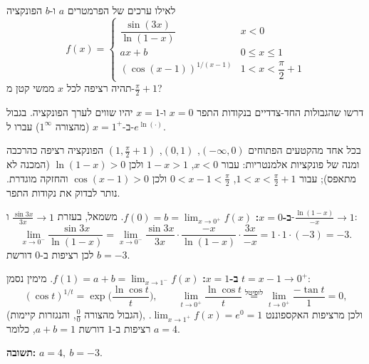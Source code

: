 
\begin{question}
לאילו ערכים של הפרמטרים $a$ ו-$b$ הפונקציה
\[ f(x)=\begin{cases} \dfrac{\sin(3x)}{\ln(1-x)} & x<0\\[2mm] ax+b & 0\le x\le1\\[2mm] (\cos(x-1))^{1/(x-1)} & 1<x<\dfrac{\pi}{2}+1\end{cases} \]
תהיה רציפה לכל $x$ ממשי קטן מ-$\frac{\pi}{2}+1$?
\end{question}

\begin{hint}
דרשו שהגבולות החד-צדדיים בנקודות התפר $x=0$ ו-$x=1$ יהיו שווים לערך הפונקציה. בגבול ב-$x=1^+$ (מהצורה $1^\infty$) עברו ל-$e^{\ln(\cdot)}$.
\end{hint}

\begin{solution}
בכל אחד מהקטעים הפתוחים $(-\infty,0)$, $(0,1)$, $(1,\frac\pi2+1)$ הפונקציה רציפה כהרכבה ומנה של פונקציות אלמנטריות: עבור $x<0$, $1-x>1$ ולכן $\ln(1-x)>0$ (המכנה לא מתאפס); עבור $1<x<\frac\pi2+1$, $0<x-1<\frac\pi2$ ולכן $\cos(x-1)>0$ והחזקה מוגדרת. נותר לבדוק את נקודות התפר.

\textbf{ב-$x=0$:} $f(0)=b=\lim_{x\to0^+}f(x)$. משמאל, בעזרת $\frac{\sin 3x}{3x}\to1$ ו-$\frac{\ln(1-x)}{-x}\to1$:
\[ \lim_{x\to0^-}\frac{\sin3x}{\ln(1-x)}=\lim_{x\to0^-}\frac{\sin3x}{3x}\cdot\frac{-x}{\ln(1-x)}\cdot\frac{3x}{-x}=1\cdot1\cdot(-3)=-3 . \]
לכן רציפות ב-$0$ דורשת $b=-3$.

\textbf{ב-$x=1$:} $f(1)=a+b=\lim_{x\to1^-}f(x)$. מימין נסמן $t=x-1\to0^+$:
\[ (\cos t)^{1/t}=\exp\Big(\frac{\ln\cos t}{t}\Big),\qquad \lim_{t\to0^+}\frac{\ln\cos t}{t}\overset{\text{לופיטל}}{=}\lim_{t\to0^+}\frac{-\tan t}{1}=0 , \]
(הגבול מהצורה $\frac00$, והנגזרות קיימות), ולכן מרציפות האקספוננט $\lim_{x\to1^+}f(x)=e^0=1$. רציפות ב-$1$ דורשת $a+b=1$, כלומר $a=4$.

\textbf{תשובה:} $\boxed{a=4,\ b=-3}$.
\end{solution}
